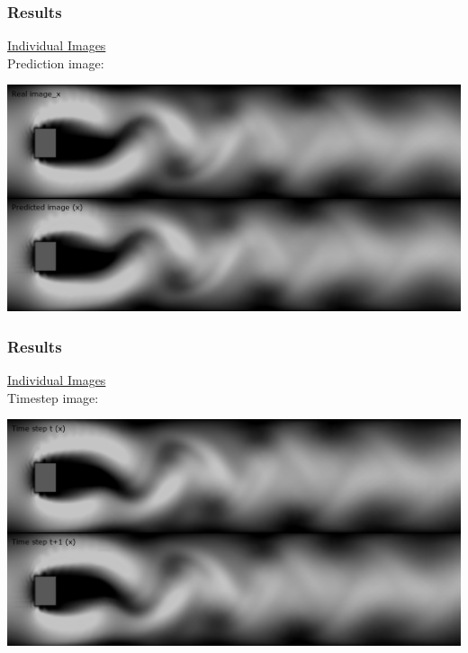 \documentclass[18pt]{beamer}
\begin{document}
\begin{frame}[t]
  \frametitle{Results}
  \vspace{-1cm}
  \begin{center}
    {\large \underline{Individual Images}} \\
    Prediction image:
  \end{center}
  \begin{center}
    \includegraphics[scale=0.32]{images/res/prediction}
  \end{center}  
\end{frame}


\begin{frame}[t]
  \frametitle{Results}
  \vspace{-1cm}
  \begin{center}
    {\large \underline{Individual Images}} \\
    Timestep image:
  \end{center}
  \begin{center}
    \includegraphics[scale=0.32]{images/res/timestep}
  \end{center}  
\end{frame}
\end{document}
